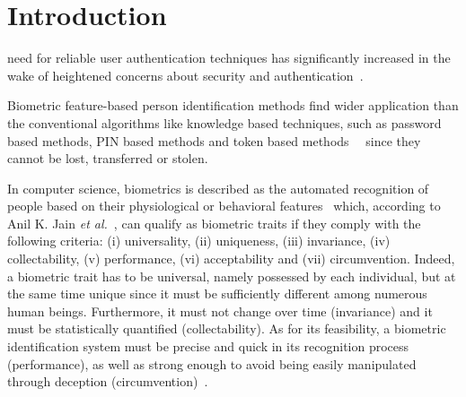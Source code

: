 \documentclass[journal]{IEEEtran}
\begin{document}
%
\IEEEpeerreviewmaketitle



\section{Introduction}
% 
% 
% 
% 

 need for reliable user authentication techniques has significantly increased in the wake of heightened concerns about security and authentication~\cite{cryptography2010001}.

Biometric feature-based person identification methods find wider application than the conventional algorithms like knowledge based techniques, such as password based methods, PIN based methods and token based methods~\cite{Meraoumia}~\cite{DZhang} since they cannot be lost, transferred or stolen.

In computer science, biometrics is described as the automated recognition of people based on their physiological or behavioral features~\cite{Unar} which, according to Anil K. Jain \textit{et al.}~\cite{Jain}, can qualify as biometric traits if they comply with the following criteria: (i) universality, (ii) uniqueness, (iii) invariance, (iv) collectability, (v) performance, (vi) acceptability and (vii) circumvention.
Indeed, a biometric trait has to be universal, namely possessed by each individual, but at the same time unique since it must be sufficiently different among numerous human beings. Furthermore, it must not change over time (invariance) and it must be statistically quantified (collectability). As for its feasibility, a biometric identification system must be precise and quick in its recognition process (performance), as well as strong enough to avoid being easily manipulated through deception (circumvention)~\cite{Jain}.
\end{document}
